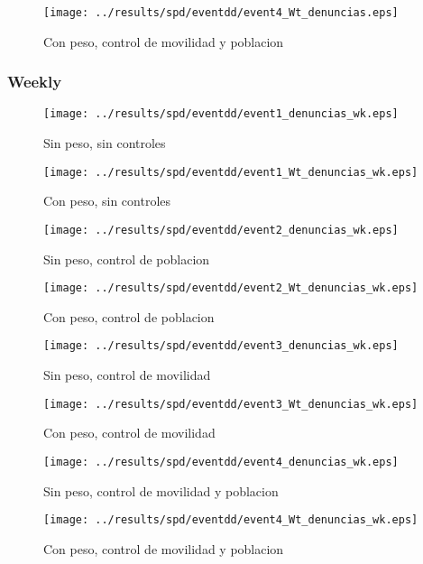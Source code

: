 \documentclass[11pt,letterpaper]{article}
\begin{document}
\begin{figure}[H]
\caption{Con peso, control de movilidad y poblacion}
\centering
\texttt{[image: ../results/spd/eventdd/event4\_Wt\_denuncias.eps]}
\end{figure}

		\subsubsection{Weekly}
\begin{figure}[H]
\caption{Sin peso, sin controles}
\centering
\texttt{[image: ../results/spd/eventdd/event1\_denuncias\_wk.eps]}
\end{figure}

\begin{figure}[H]
\caption{Con peso, sin controles}
\centering
\texttt{[image: ../results/spd/eventdd/event1\_Wt\_denuncias\_wk.eps]}
\end{figure}
\begin{figure}[H]
\caption{Sin peso, control de poblacion}
\centering
\texttt{[image: ../results/spd/eventdd/event2\_denuncias\_wk.eps]}
\end{figure}

\begin{figure}[H]
\caption{Con peso, control de poblacion}
\centering
\texttt{[image: ../results/spd/eventdd/event2\_Wt\_denuncias\_wk.eps]}
\end{figure}
\begin{figure}[H]
\caption{Sin peso, control de movilidad}
\centering
\texttt{[image: ../results/spd/eventdd/event3\_denuncias\_wk.eps]}
\end{figure}

\begin{figure}[H]
\caption{Con peso, control de movilidad}
\centering
\texttt{[image: ../results/spd/eventdd/event3\_Wt\_denuncias\_wk.eps]}
\end{figure}
\begin{figure}[H]
\caption{Sin peso, control de movilidad y poblacion}
\centering
\texttt{[image: ../results/spd/eventdd/event4\_denuncias\_wk.eps]}
\end{figure}

\begin{figure}[H]
\caption{Con peso, control de movilidad y poblacion}
\centering
\texttt{[image: ../results/spd/eventdd/event4\_Wt\_denuncias\_wk.eps]}
\end{figure}
\end{document}
